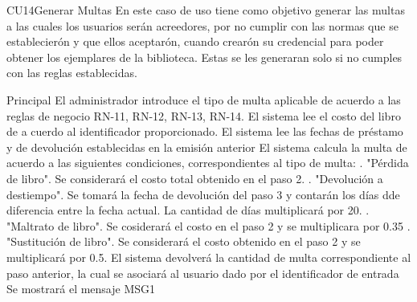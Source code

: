 \begin{UseCase}{CU14}{Generar Multas}{
		En este caso de uso tiene como objetivo generar las multas a las cuales los usuarios serán 			 acreedores, por no cumplir con las normas que se establecierón y que ellos aceptarón, cuando crearón su credencial para poder obtener los ejemplares de la biblioteca. Estas se les generaran solo si no cumples con las reglas establecidas.
	}
\end{UseCase}
\begin{UCtrayectoria}{Principal}
	\UCpaso[\UCactor] El administrador introduce el tipo de multa aplicable de acuerdo a las reglas de negocio RN-11, RN-12, RN-13, RN-14. 
	\UCpaso[\UCsist] El sistema lee el costo del libro de a cuerdo al identificador proporcionado. 
	\UCpaso[\UCsist] El sistema lee las fechas de préstamo y de devolución establecidas en la emisión anterior 
	\UCpaso[\UCsist] El sistema calcula la multa de acuerdo a las siguientes condiciones, correspondientes al tipo de multa: . "Pérdida de libro". Se considerará el costo total obtenido en el paso 2. . "Devolución a destiempo". Se tomará la fecha de devolución del paso 3 y contarán los días dde diferencia entre la fecha actual. La cantidad de días multiplicará por 20. . "Maltrato de libro". Se cosiderará el costo en el paso 2 y se multiplicara por 0.35 . "Sustitución de libro". Se considerará el costo obtenido en el paso 2 y se multiplicará por 0.5.
	\UCpaso[\UCsist] El sistema devolverá la cantidad de multa correspondiente al paso anterior, la cual se asociará al usuario dado por el identificador de entrada  
	\UCpaso[\UCsist] Se mostrará el mensaje MSG1
\end{UCtrayectoria}
